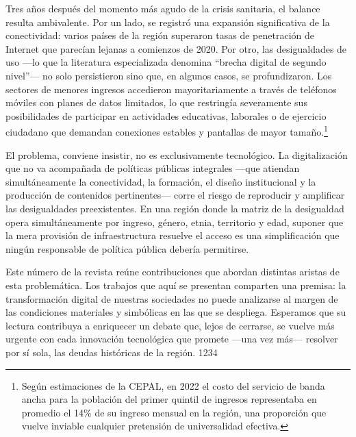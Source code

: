Tres años después del momento más agudo de la crisis sanitaria, el balance resulta ambivalente. Por un lado, se registró una expansión significativa de la conectividad: varios países de la región superaron tasas de penetración de Internet que parecían lejanas a comienzos de 2020. Por otro, las desigualdades de uso —lo que la literatura especializada denomina “brecha digital de segundo nivel”— no solo persistieron sino que, en algunos casos, se profundizaron. Los sectores de menores ingresos accedieron mayoritariamente a través de teléfonos móviles con planes de datos limitados, lo que restringía severamente sus posibilidades de participar en actividades educativas, laborales o de ejercicio ciudadano que demandan conexiones estables y pantallas de mayor tamaño.\footnote{Según estimaciones de la CEPAL, en 2022 el costo del servicio de
banda ancha para la población del primer quintil de ingresos
representaba en promedio el 14\% de su ingreso mensual en la región, una
proporción que vuelve inviable cualquier pretensión de universalidad
efectiva.}

El problema, conviene insistir, no es exclusivamente tecnológico. La digitalización que no va acompañada de políticas públicas integrales —que atiendan simultáneamente la conectividad, la formación, el diseño institucional y la producción de contenidos pertinentes— corre el riesgo de reproducir y amplificar las desigualdades preexistentes. En una región donde la matriz de la desigualdad opera simultáneamente por ingreso, género, etnia, territorio y edad, suponer que la mera provisión de infraestructura resuelve el acceso es una simplificación que ningún responsable de política pública debería permitirse.

Este número de la revista reúne contribuciones que abordan distintas aristas de esta problemática. Los trabajos que aquí se presentan comparten una premisa: la transformación digital de nuestras sociedades no puede analizarse al margen de las condiciones materiales y simbólicas en las que se despliega. Esperamos que su lectura contribuya a enriquecer un debate que, lejos de cerrarse, se vuelve más urgente con cada innovación tecnológica que promete —una vez más— resolver por sí sola, las deudas históricas de la región. 1234

